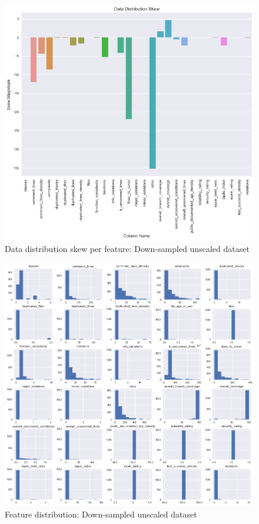 \begin{figure}[!h]
    \centering
    \includegraphics[scale=0.6]{Figures/feature-dist/Data_Distribution_Skew_unmodified_downsampled.png}
    \caption{Data distribution skew per feature: Down-sampled unscaled dataset}
    \label{fig:feature-dist:skew:unmodified-upsample}
\end{figure}

\begin{figure}[!h]
    \centering
    \includegraphics[scale=0.45]{Figures/feature-dist/attrib_dist_downscaled_unmod.png}
    \caption{Feature distribution: Down-sampled unscaled dataset}
    \label{fig:feature-dist:downsampled-all-feature-dist}
\end{figure}


